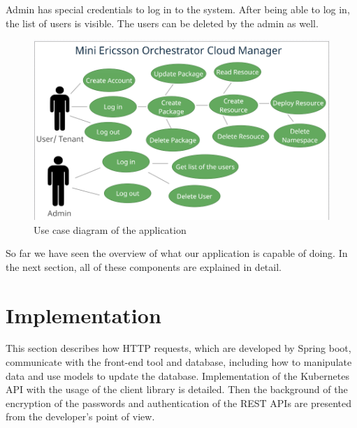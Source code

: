 Admin has special credentials to log in to the system. After being able to log in, the list of users is visible. The users can be deleted by the admin as well.

\begin{figure}[H]
	\centering
	\includegraphics[width=\textwidth]{images/use-case-diagram-3.png}
	\caption{Use case diagram of the application}
	\label{ssec:figure-for-life-cycle-application}
\end{figure}
So far we have seen the overview of what our application is capable of doing. In the next section, all of these components are explained in detail.

\label{sec:implementation}
\section{Implementation}
This section describes how HTTP requests, which are developed by Spring boot, communicate with the front-end tool and database, including how to manipulate data and use models to update the database. Implementation of the Kubernetes API with the usage of the client library is detailed. Then the background of the encryption of the passwords and authentication of the REST APIs are presented from the developer's point of view.

\label{subsec:api-overview}
